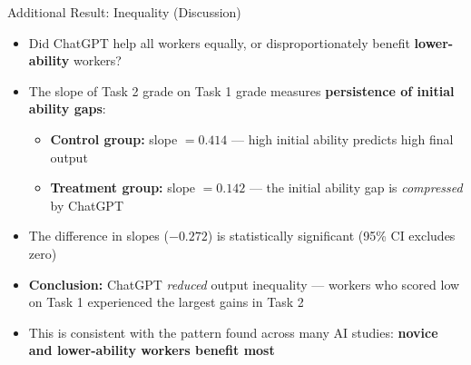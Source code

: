 \documentclass[hyperref={pdfpagelabels=false}]{beamer}
\begin{document}
	\begin{frame}{Additional Result: Inequality (Discussion)}
		\begin{itemize}
			\item Did ChatGPT help all workers equally, or disproportionately benefit \textbf{lower-ability} workers?
			\vspace{0.3cm}
			\item The slope of Task 2 grade on Task 1 grade measures \textbf{persistence of initial ability gaps}:
			\vspace{0.2cm}
			\begin{itemize}
				\item \textbf{Control group:} slope $= 0.414$ --- high initial ability predicts high final output
				\vspace{0.2cm}
				\item \textbf{Treatment group:} slope $= 0.142$ --- the initial ability gap is \emph{compressed} by ChatGPT
			\end{itemize}
			\vspace{0.3cm}
			\item The difference in slopes ($-0.272$) is statistically significant (95\% CI excludes zero)
			\vspace{0.3cm}
			\item \textbf{Conclusion:} ChatGPT \emph{reduced} output inequality --- workers who scored low on Task 1 experienced the largest gains in Task 2
			\vspace{0.3cm}
			\item This is consistent with the pattern found across many AI studies: \textbf{novice and lower-ability workers benefit most}
		\end{itemize}
	\end{frame}
	
\end{document}
